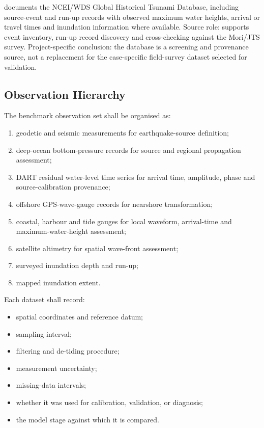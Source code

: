 \textcite{noaaNceiHistoricalTsunami} documents the NCEI/WDS Global
Historical Tsunami Database, including source-event and run-up records
with observed maximum water heights, arrival or travel times and
inundation information where available. Source role: supports event
inventory, run-up record discovery and cross-checking against the
Mori/JTS survey. Project-specific conclusion: the database is a
screening and provenance source, not a replacement for the
case-specific field-survey dataset selected for validation.

\subsection{Observation Hierarchy}
\label{sec:res-dat-obs-observation}

The benchmark observation set shall be organised as:

\begin{enumerate}
  \item geodetic and seismic measurements for earthquake-source
    definition;
  \item deep-ocean bottom-pressure records for source and regional
    propagation assessment;
  \item DART residual water-level time series for arrival time,
    amplitude, phase and source-calibration provenance;
  \item offshore GPS-wave-gauge records for nearshore transformation;
  \item coastal, harbour and tide gauges for local waveform,
    arrival-time and maximum-water-height assessment;
  \item satellite altimetry for spatial wave-front assessment;
  \item surveyed inundation depth and run-up;
  \item mapped inundation extent.
\end{enumerate}

Each dataset shall record:

\begin{itemize}
  \item spatial coordinates and reference datum;
  \item sampling interval;
  \item filtering and de-tiding procedure;
  \item measurement uncertainty;
  \item missing-data intervals;
  \item whether it was used for calibration, validation, or
    diagnosis;
  \item the model stage against which it is compared.
\end{itemize}

